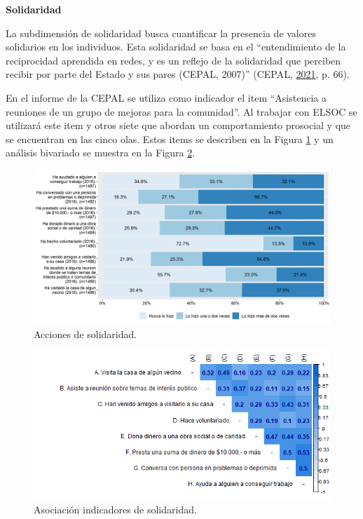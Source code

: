 \documentclass[
  12pt,
]{book}
\begin{document}
\textbf{Solidaridad}

La subdimensión de solidaridad busca cuantificar la presencia de valores solidarios en los individuos. Esta solidaridad se basa en el ``entendimiento de la reciprocidad aprendida en redes, y es un reflejo de la solidaridad que perciben recibir por parte del Estado y sus pares (CEPAL, 2007)'' (CEPAL, \protect\hyperlink{ref-cepal_cohesion_2021}{2021}, p. 66).

En el informe de la CEPAL se utiliza como indicador el item ``Asistencia a reuniones de un grupo de mejoras para la comunidad''. Al trabajar con ELSOC se utilizará este item y otros siete que abordan un comportamiento prosocial y que se encuentran en las cinco olas. Estos items se describen en la Figura \ref{fig:solidaridad} y un análisis bivariado se muestra en la Figura \ref{fig:solidaridad-cor}.

\begin{figure}[H]

{\centering \includegraphics[width=1\linewidth,height=1\textheight]{output/graphs/solidaridad} 

}

\caption{Acciones de solidaridad.}\label{fig:solidaridad}
\end{figure}

\begin{figure}[H]

{\centering \includegraphics[width=1\linewidth,height=1\textheight]{output/graphs/solidaridad_cor} 

}

\caption{Asociación indicadores de solidaridad.}\label{fig:solidaridad-cor}
\end{figure}
\end{document}
